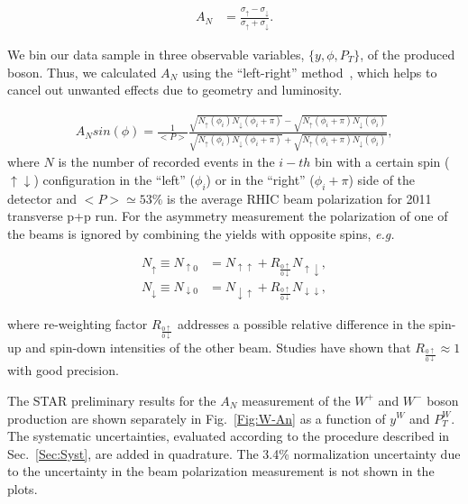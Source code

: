 \documentclass[12pt]{article}
\begin{document}
\begin{align}
\label{eq_anapower}
A_N &= \frac{\sigma_\uparrow - \sigma_\downarrow}{\sigma_\uparrow +
   \sigma_\downarrow}.
\end{align}

We bin our data sample in three observable variables, $\{y, \phi, P_T\}$, of the produced boson. Thus, 
we calculated $A_{N}$ using the ``left-right'' method~\cite{sqrtFormula}, which helps to cancel out unwanted effects due to geometry and luminosity.

\begin{align}
A_{N } sin(\phi)= \frac{1}{<P>}
\frac{\sqrt{N_\uparrow(\phi_i)N_\downarrow(\phi_i+\pi)} - \sqrt{N_\uparrow(\phi_i+\pi)N_\downarrow(\phi_i)} } 
{\sqrt{N_\uparrow(\phi_i)N_\downarrow(\phi_i+\pi)} + \sqrt{N_\uparrow(\phi_i+\pi)N_\downarrow(\phi_i)}},
\end{align}
where $N$ is the number of recorded events in the $i-th$ bin with a certain spin ($\uparrow \downarrow$) configuration in the ``left'' ($\phi_{i}$) or in the ``right'' ($\phi_{i} + \pi$) side of the detector and $<P>\simeq 53\%$ is the average RHIC beam polarization for 2011 transverse p+p run.  
For the asymmetry measurement the polarization of one of the beams is ignored by combining the
yields with opposite spins, \textit{e.g.}

\begin{align}
N_{\uparrow}   \equiv N_{\uparrow0}   &= N_{\uparrow\uparrow}   + R_{\frac{0\uparrow}{0\downarrow}} N_{\uparrow\downarrow},\\
N_{\downarrow} \equiv N_{\downarrow0} &= N_{\downarrow\uparrow} + R_{\frac{0\uparrow}{0\downarrow}} N_{\downarrow\downarrow},
\end{align}

\noindent
where re-weighting factor $R_{\frac{0\uparrow}{0\downarrow}}$ addresses a
possible relative difference in the spin-up and spin-down intensities of the
other beam. Studies have shown that $R_{\frac{0\uparrow}{0\downarrow}} \approx
1$ with good precision.

The STAR preliminary results for the $A_{N}$ measurement of the $W^{+}$ and $W^{-}$ boson production are shown separately in Fig.~\ref{Fig:W-An} as a function of $y^{W}$ and $P_{T}^{W}$. 
The systematic uncertainties, evaluated according to the procedure described in Sec.~\ref{Sec:Syst}, are added in quadrature. 
The 3.4\% normalization uncertainty due to the uncertainty in the beam polarization measurement is not shown in the plots. 
\end{document}
